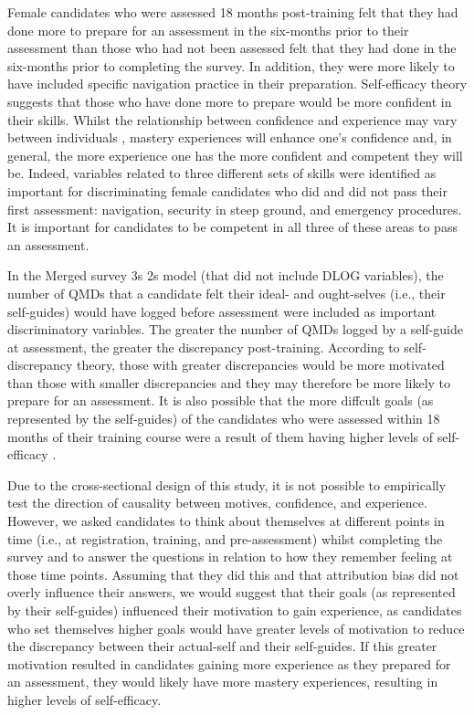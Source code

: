 \documentclass[
  12pt,
  a4paper,
]{book}
\begin{document}
Female candidates who were assessed 18 months post-training felt that they had done more to prepare for an assessment in the six-months prior to their assessment than those who had not been assessed felt that they had done in the six-months prior to completing the survey. In addition, they were more likely to have included specific navigation practice in their preparation. Self-efficacy theory suggests that those who have done more to prepare would be more confident in their skills. Whilst the relationship between confidence and experience may vary between individuals \citep{Weinberg2014}, mastery experiences will enhance one's confidence \citep{Bandura1977} and, in general, the more experience one has the more confident and competent they will be. Indeed, variables related to three different sets of skills were identified as important for discriminating female candidates who did and did not pass their first assessment: navigation, security in steep ground, and emergency procedures. It is important for candidates to be competent in all three of these areas to pass an assessment.

In the Merged survey 3s 2s model (that did not include DLOG variables), the number of QMDs that a candidate felt their ideal- and ought-selves (i.e., their self-guides) would have logged before assessment were included as important discriminatory variables. The greater the number of QMDs logged by a self-guide at assessment, the greater the discrepancy post-training. According to self-discrepancy theory, those with greater discrepancies would be more motivated than those with smaller discrepancies \citep{Higgins1987} and they may therefore be more likely to prepare for an assessment. It is also possible that the more diffcult goals (as represented by the self-guides) of the candidates who were assessed within 18 months of their training course were a result of them having higher levels of self-efficacy \citep[cf.~][]{Bandura1986}.

Due to the cross-sectional design of this study, it is not possible to empirically test the direction of causality between motives, confidence, and experience. However, we asked candidates to think about themselves at different points in time (i.e., at registration, training, and pre-assessment) whilst completing the survey and to answer the questions in relation to how they remember feeling at those time points. Assuming that they did this and that attribution bias did not overly influence their answers, we would suggest that their goals (as represented by their self-guides) influenced their motivation to gain experience, as candidates who set themselves higher goals would have greater levels of motivation to reduce the discrepancy between their actual-self and their self-guides. If this greater motivation resulted in candidates gaining more experience as they prepared for an assessment, they would likely have more mastery experiences, resulting in higher levels of self-efficacy.
\end{document}
